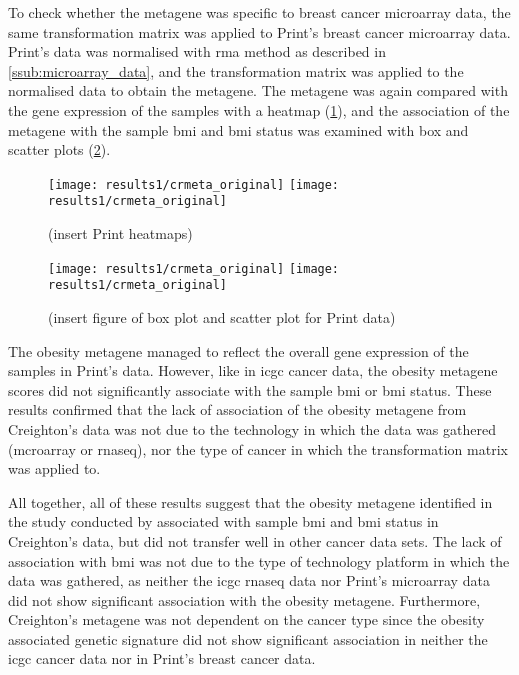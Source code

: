 \noindent
To check whether the metagene was specific to breast cancer microarray data, the same transformation matrix was applied to Print's breast cancer microarray data.
Print's data was normalised with \gls{rma} method as described in \cref{ssub:microarray_data}, and the transformation matrix was applied to the normalised data to obtain the metagene.
The metagene was again compared with the gene expression of the samples with a heatmap (\cref{fig:crmetaprint1}), and the association of the metagene with the sample \gls{bmi} and \gls{bmi} status was examined with box and scatter plots (\cref{fig:crmetaboxprint1}).

\begin{figure}[htp!]
	\centering
	\texttt{[image: results1/crmeta\_original]}
	\hfill
	\texttt{[image: results1/crmeta\_original]}
	\caption[Creighton metagene and Print's cancer data]{(insert Print heatmaps)}
	\label{fig:crmetaprint1}
\end{figure}

\begin{figure}[htp!]
	\centering
	\texttt{[image: results1/crmeta\_original]}
	\hfill
	\texttt{[image: results1/crmeta\_original]}
	\caption[Creighton metagene and sample \gls{bmi}/\gls{bmi} status in Print's data]{(insert figure of box plot and scatter plot for Print data)}
	\label{fig:crmetaboxprint1}
\end{figure}

The obesity metagene managed to reflect the overall gene expression of the samples in Print's data.
However, like in \gls{icgc} cancer data, the obesity metagene scores did not significantly associate with the sample \gls{bmi} or \gls{bmi} status.
These results confirmed that the lack of association of the obesity metagene from Creighton's data was not due to the technology in which the data was gathered (mcroarray or \gls{rnaseq}), nor the type of cancer in which the transformation matrix was applied to.

All together, all of these results suggest that the obesity metagene identified in the study conducted by \citet{Creighton2012} associated with sample \gls{bmi} and \gls{bmi} status in Creighton's data, but did not transfer well in other cancer data sets.
The lack of association with \gls{bmi} was not due to the type of technology platform in which the data was gathered, as neither the \gls{icgc} \gls{rnaseq} data nor Print's microarray data did not show significant association with the obesity metagene.
Furthermore, Creighton's metagene was not dependent on the cancer type since the obesity associated genetic signature did not show significant association in neither the \gls{icgc} cancer data nor in Print's breast cancer data.

